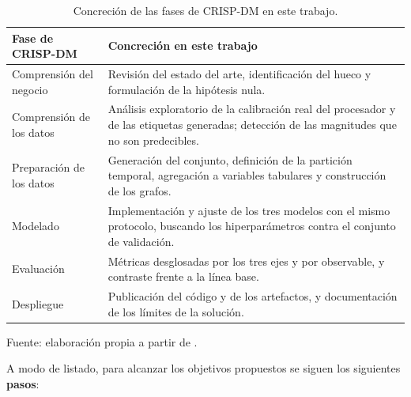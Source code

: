 \begin{table}[t]
    \centering
    \small
    \begin{tabular}{@{}p{}p{}@{}}
        \toprule
        \textbf{Fase de CRISP-DM} & \textbf{Concreción en este trabajo} \\
        \midrule
        Comprensión del negocio & Revisión del estado del arte, identificación del hueco y
        formulación de la hipótesis nula. \\
        Comprensión de los datos & Análisis exploratorio de la calibración real del procesador
        y de las etiquetas generadas; detección de las magnitudes que no son predecibles. \\
        Preparación de los datos & Generación del conjunto, definición de la partición
        temporal, agregación a variables tabulares y construcción de los grafos. \\
        Modelado & Implementación y ajuste de los tres modelos con el mismo protocolo,
        buscando los hiperparámetros contra el conjunto de validación. \\
        Evaluación & Métricas desglosadas por los tres ejes y por observable, y contraste
        frente a la línea base. \\
        Despliegue & Publicación del código y de los artefactos, y documentación de los
        límites de la solución. \\
        \bottomrule
    \end{tabular}

    \caption{Concreción de las fases de CRISP-DM en este trabajo.}
    \label{tab:crispdm}

    {\footnotesize Fuente: elaboración propia a partir de .}
\end{table}

A modo de listado, para alcanzar los objetivos propuestos se siguen los siguientes
\textbf{pasos}:

